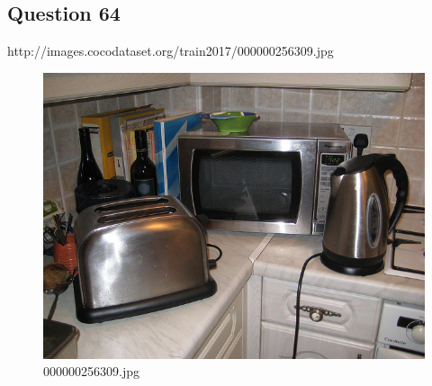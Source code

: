 \subsection*{Question 64}
http://images.cocodataset.org/train2017/000000256309.jpg
\begin{figure}[h]
    \centering
    \includegraphics[width=0.8\linewidth]{../image set/hard/000000256309.jpg}
    \caption{000000256309.jpg}
\end{figure}
